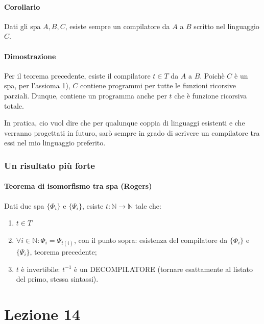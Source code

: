 \documentclass{article}
\begin{document}
\paragraph{Corollario} Dati gli spa $A,B,C$, esiste sempre un compilatore da $A$ a $B$ scritto nel linguaggio $C$.
\paragraph{Dimostrazione}
Per il teorema precedente, esiste il compilatore $t \in T$ da $A$ a $B$. Poichè $C$ è un spa, per l'assioma 1), $C$ contiene programmi per tutte le funzioni ricorsive parziali. Dunque, contiene un programma anche per $t$ che è funzione ricorsiva totale.



In pratica, cio vuol dire che per qualunque coppia di linguaggi esistenti e che verranno progettati in futuro, sarò sempre in grado di scrivere un compilatore tra essi nel mio linguaggio preferito.

\subsubsection{Un risultato più forte}
\paragraph{Teorema di isomorfismo tra spa (Rogers)}
Dati due spa $\{ \Phi_i \}$ e $\{ \Psi_i \}$, esiste $t:\mathbb{N} \rightarrow \mathbb{N}$ tale che:
\begin{enumerate}
	\item $t \in T$
	\item $\forall i \in \mathbb{N}:\Phi_i=\Psi_{t(i)}$, con il punto sopra: esistenza del compilatore da $\{ \Phi_i \}$ e $\{ \Psi_i \}$, teorema precedente;
	\item $t$ è invertibile: $t^{-1}$ è un DECOMPILATORE (tornare esattamente al listato del primo, stessa sintassi).
\end{enumerate}


\section{Lezione 14}
\end{document}
